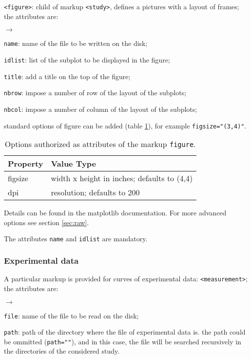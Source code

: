\documentclass[a4paper,10pt,twoside]{csshortdoc}
\begin{document}
\texttt{<figure>}: child of markup \texttt{<study>}, defines a pictures
with a layout of frames; the attributes are:
\begin{list}{$\rightarrow$}{}
\item \texttt{name}: name of the file to be written on the disk;
\item \texttt{idlist}: list of the subplot to be displayed in the figure;
\item \texttt{title}: add a title on the top of the figure;
\item \texttt{nbrow}: impose a number of row of the layout of the subplots;
\item \texttt{nbcol}: impose a number of column of the layout of the subplots;
\item standard options of figure can be added (table \ref{table:fig}),
for example \texttt{figsize="(3,4)"}.

\begin{table}[htbp]
\begin{center}
\begin{tabular}{|l|l|}
\hline
\textbf{Property} & \textbf{Value Type} \\
\hline
figsize   & width x height in inches; defaults to (4,4) \\
dpi       & resolution; defaults to 200 \\
\hline
\end{tabular}
\end{center}
\caption{Options authorized as attributes of the markup \texttt{figure}.}
\label{table:fig}
\end{table}

Details can be found in the matplotlib documentation.
For more advanced options see section \ref{sec:raw}.

\end{list}

The attributes \texttt{name} and \texttt{idlist} are mandatory.

\subsubsection{Experimental data}

A particular markup is provided for curves of experimental data:
\texttt{<measurement>}; the attributes are:
\begin{list}{$\rightarrow$}{}
\item \texttt{file}: name of the file to be read on the disk;
\item \texttt{path}: path of the directory where the file of experimental data
is. the path could be ommitted (\texttt{path=""}), and in this case, the file
will be searched recursively in the directories of the considered study.
\end{list}
\end{document}
